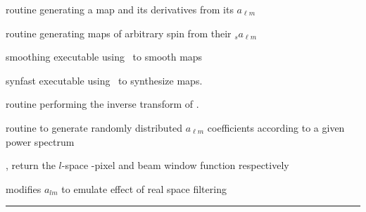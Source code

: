 \begin{related}
  \begin{sulist}{} %
   \item[\htmlref{alm2map\_der}{sub:alm2map_der}] routine generating a map and
   its derivatives from its $a_{\ell m}$
   \item[\htmlref{alm2map\_spin}{sub:alm2map_spin}] routine generating maps of
arbitrary spin from their  ${_s}a_{\ell m}$
  \item[smoothing] executable using \thedocid\ to smooth maps
  \item[synfast] executable using \thedocid\ to synthesize maps.
  \item[\htmlref{map2alm}{sub:map2alm}] routine performing the inverse transform
  of \thedocid.
  \item[\htmlref{create\_alm}{sub:create_alm}] routine to generate randomly
  distributed $a_{\ell m}$ coefficients according to a given power spectrum
  \item[\htmlref{pixel\_window}{sub:pixel_window},
\htmlref{generate\_beam}{sub:generate_beam}] return the $l$-space \healpix-pixel and beam window function respectively
  \item[\htmlref{alter\_alm}{sub:alter_alm}] modifies $a_{lm}$ to emulate effect
of real space filtering
  \end{sulist}
\end{related}

\rule{\hsize}{2mm}

\newpage
